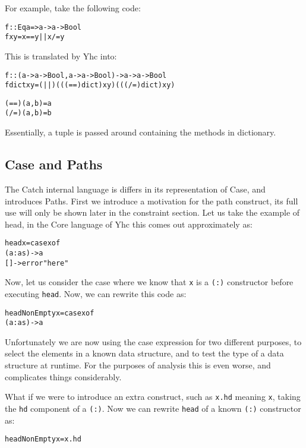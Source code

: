 \documentclass[preprint]{sigplanconf}
\newcommand{\T}[1]{\texttt{#1}}
\begin{document}
For example, take the following code:

\begin{alltt}
 f :: Eq a => a -> a -> Bool
 f x y = x == y || x /= y
\end{alltt}

This is translated by Yhc into:

\begin{alltt}
 f :: (a -> a -> Bool, a -> a -> Bool) -> a -> a -> Bool
 f dict x y = (||) (((==) dict) x y) (((/=) dict) x y)

 (==) (a,b) = a
 (/=) (a,b) = b
\end{alltt}

Essentially, a tuple is passed around containing the methods in dictionary.


\subsection{Case and Paths}

The Catch internal language is differs in its representation of Case, and
introduces Paths. First we introduce a motivation for the path construct, its
full use will only be shown later in the constraint section. Let us take the
example of head, in the Core language of Yhc this comes out approximately as:

\begin{alltt}
head x = case x of
            (a:as) -> a
            [] -> error "here"
\end{alltt}

Now, let us consider the case where we know that \T{x} is a \T{(:)} constructor
before executing \T{head}. Now, we can rewrite this code as:

\begin{alltt}
 headNonEmpty x = case x of
                     (a:as) -> a
\end{alltt}

Unfortunately we are now using the case expression for two different purposes,
to select the elements in a known data structure, and to test the type of a
data structure at runtime. For the purposes of analysis this is even worse, and
complicates things considerably.

What if we were to introduce an extra construct, such as \T{x.hd} meaning
\T{x}, taking the \T{hd} component of a \T{(:)}. Now we can rewrite \T{head} of
a known \T{(:)} constructor as:

\begin{alltt}
 headNonEmpty x = x.hd
\end{alltt}
\end{document}
